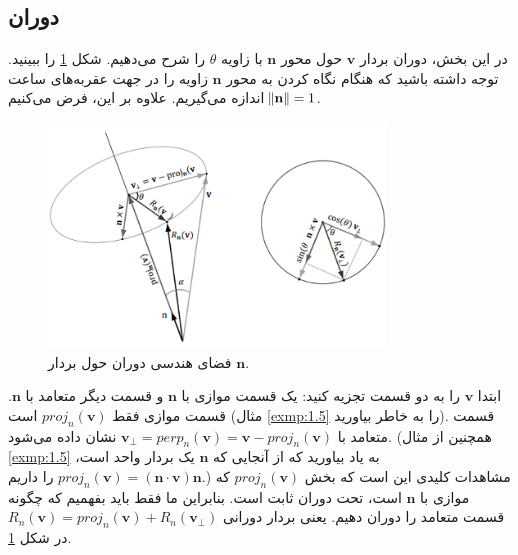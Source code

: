 \subsection{\textbf{دوران}}
\label{subsec:3.1.4}
{
    \Large
    \begin{spacing}{1.5}
        در این بخش، دوران بردار $\textbf{v}$ حول محور $\textbf{n}$ با زاویه $\theta$ را شرح می‌دهیم.
        شکل \ref{fig:4.Session.1.3.3} را ببینید.
        توجه داشته باشید که هنگام نگاه کردن به محور $\textbf{n}$ زاویه را در جهت عقربه‌های ساعت اندازه می‌گیریم.
        علاوه بر این، فرض می‌کنیم $\norm{\textbf{n}}=1$.

        \begin{figure}[H]
            \centering
            \setlength{\belowcaptionskip}{-10pt}
            \includegraphics[width=0.8\textwidth]{Images/4/3/4.Session.1.3.3}
            \caption {فضای هندسی دوران حول بردار $\textbf{n}$.}
            \label{fig:4.Session.1.3.3}
        \end{figure}

        ابتدا $\textbf{v}$ را به دو قسمت تجزیه کنید:
        یک قسمت موازی با $\textbf{n}$ و قسمت دیگر متعامد با $\textbf{n}$.
        قسمت موازی فقط $proj_{n}(\textbf{v})$ است (مثال \ref{exmp:1.5} را به خاطر بیاورید).
        قسمت متعامد با $\textbf{v}_{\perp}=perp_{n}(\textbf{v})=\textbf{v}-proj_{n}(\textbf{v})$ نشان داده می‌شود.
        (همچنین از مثال \ref{exmp:1.5} به یاد بیاورید که از آنجایی که $\textbf{n}$ یک بردار واحد است، $proj_{n}(\textbf{v})= (\textbf{n}\cdot\textbf{v})\textbf{n}$ را داریم.)
        مشاهدات کلیدی این است که بخش $proj_{n}(\textbf{v})$ که موازی با $\textbf{n}$ است، تحت دوران ثابت است.
        بنابراین ما فقط باید بفهمیم که چگونه قسمت متعامد را دوران دهیم. یعنی بردار دورانی $R_{n}(\textbf{v})=proj_{n}(\textbf{v})+R_{n}(\textbf{v}_{\perp})$ در شکل \ref{fig:4.Session.1.3.3}.


\end{spacing}}
